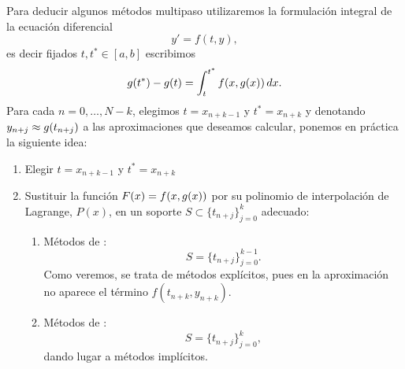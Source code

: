 Para deducir algunos métodos multipaso utilizaremos la formulación
integral de la ecuación diferencial
$$
y'=f(t,y),
$$
es decir fijados $t,t^*\in[a,b]$ escribimos
\begin{equation*}
  g(t^*)-g(t) = \int_{t}^{t^*} f(x,g(x))\, dx.
\end{equation*}
Para cada $n=0,\dots,N-k$, elegimos $t=x_{n+k-1}$ y $t^*=x_{n+k}$ y
denotando $y_{n+j}\approx g(t_{n+j})$ a las aproximaciones que
deseamos calcular,  ponemos en práctica la siguiente idea:
\begin{enumerate}
\item Elegir $t=x_{n+k-1}$ y $t^*=x_{n+k}$
\item Sustituir la función $F(x)=f(x,g(x))$ por su polinomio de
  interpolación de Lagrange, $P(x)$, en un soporte
  $S\subset \{t_{n+j}\}_{j=0}^k$ adecuado:%
  \begin{enumerate}
  \item Métodos de \emph{\AB}:
    \begin{equation*}
      S= \{t_{n+j}\}_{j=0}^{k-1}.
    \end{equation*}
    Como veremos, se trata de métodos explícitos, pues en la
    aproximación no aparece el término
    $f(t_{n+k},y_{n+k})$.
  \item  Métodos de \emph{\AM}:
    \begin{equation*}
      S= \{t_{n+j}\}_{j=0}^{k},
    \end{equation*}
    dando lugar a métodos implícitos.
  \end{enumerate}
\end{enumerate}

